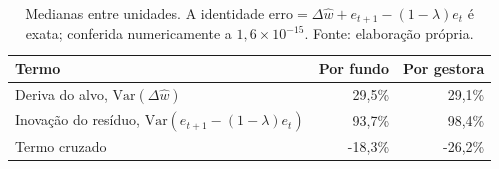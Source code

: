 \begin{table}[h]\centering\small
\caption{Decomposição estrutural: de onde vem a variância do erro.}
\label{tab:ext-estrutural}
\begin{tabular}{@{}lrr@{}}
\toprule
Termo & Por fundo & Por gestora \\
\midrule
Deriva do alvo, $\mathrm{Var}(\Delta\widehat{w})$ & 29,5\% & 29,1\% \\
Inovação do resíduo, $\mathrm{Var}(e_{t+1}-(1-\lambda)e_t)$ & 93,7\% & 98,4\% \\
Termo cruzado & -18,3\% & -26,2\% \\
\bottomrule
\end{tabular}
\caption*{\footnotesize Medianas entre unidades. A identidade $\mathrm{erro} = \Delta\widehat{w} + e_{t+1} - (1-\lambda)e_t$ é exata; conferida numericamente a $1{,}6\times10^{-15}$. Fonte: elaboração própria.}
\end{table}

